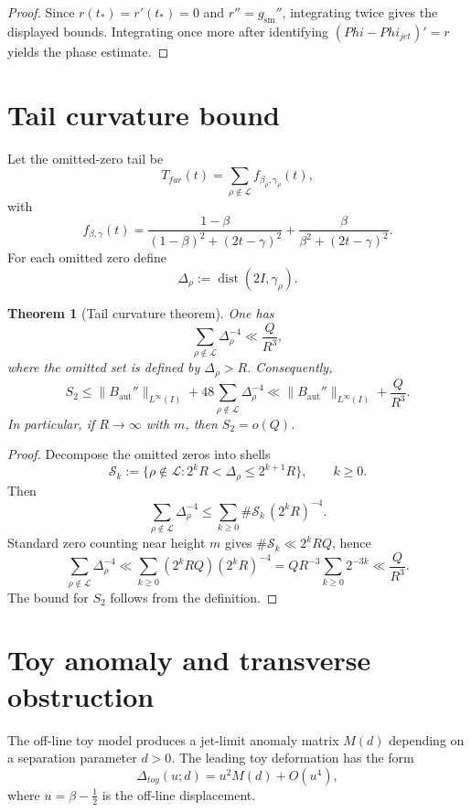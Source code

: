 \documentclass[11pt,a4paper]{amsart}
\def\Phi{Phi}%
\def\toy{toy}%
\def\jet{jet}%
\def\far{far}%
\theoremstyle{plain}
\newtheorem{theorem}{Theorem}[section]
\theoremstyle{definition}
\newcommand{\Ph}{\Phi}
\newcommand{\Aut}{\mathrm{aut}}
\newcommand{\sm}{\mathrm{sm}}
\newcommand{\far}{\mathrm{far}}
\newcommand{\toy}{\mathrm{toy}}
\newcommand{\jet}{\mathrm{jet}}
\newcommand{\dist}{\operatorname{dist}}
\begin{document}
\begin{proof}
Since $r(t_*)=r'(t_*)=0$ and $r''=g_{\sm}''$, integrating twice gives the displayed bounds. Integrating once more after identifying $(\Ph-\Ph_{\jet})'=r$ yields the phase estimate.
\end{proof}

\section{Tail curvature bound}

Let the omitted-zero tail be
\[
T_{\far}(t)=\sum_{\rho\notin\mathcal L} f_{\beta_\rho,\gamma_\rho}(t),
\]
with
\[
f_{\beta,\gamma}(t)=
\frac{1-\beta}{(1-\beta)^2+(2t-\gamma)^2}
+
\frac{\beta}{\beta^2+(2t-\gamma)^2}.
\]
For each omitted zero define
\[
\Delta_\rho:=\dist(2I,\gamma_\rho).
\]

\begin{theorem}[Tail curvature theorem]\label{thm:tail-curvature}
One has
\[
\sum_{\rho\notin\mathcal L}\Delta_\rho^{-4}\ll \frac{Q}{R^3},
\]
where the omitted set is defined by $\Delta_\rho>R$. Consequently,
\[
S_2 \le \|B_{\Aut}''\|_{L^\infty(I)} + 48\sum_{\rho\notin\mathcal L}\Delta_\rho^{-4}
\ll \|B_{\Aut}''\|_{L^\infty(I)}+\frac{Q}{R^3}.
\]
In particular, if $R\to\infty$ with $m$, then $S_2=o(Q)$.
\end{theorem}

\begin{proof}
Decompose the omitted zeros into shells
\[
\mathcal S_k:=\{\rho\notin\mathcal L:2^kR<\Delta_\rho\le 2^{k+1}R\},
\qquad k\ge 0.
\]
Then
\[
\sum_{\rho\notin\mathcal L}\Delta_\rho^{-4}
\le
\sum_{k\ge 0}\#\mathcal S_k\,(2^kR)^{-4}.
\]
Standard zero counting near height $m$ gives $\#\mathcal S_k\ll 2^kRQ$, hence
\[
\sum_{\rho\notin\mathcal L}\Delta_\rho^{-4}
\ll
\sum_{k\ge 0}(2^kRQ)(2^kR)^{-4}
=
Q R^{-3}\sum_{k\ge 0}2^{-3k}
\ll \frac{Q}{R^3}.
\]
The bound for $S_2$ follows from the definition.
\end{proof}

\section{Toy anomaly and transverse obstruction}

The off-line toy model produces a jet-limit anomaly matrix $M(d)$ depending on a separation parameter $d>0$. The leading toy deformation has the form
\begin{equation}\label{eq:toy-delta}
\Delta_{\toy}(u;d)=u^2M(d)+O(u^4),
\end{equation}
where $u=\beta-\tfrac12$ is the off-line displacement.
\end{document}
